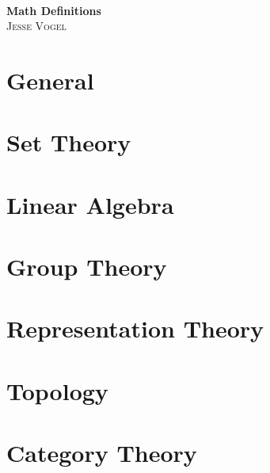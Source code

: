 \documentclass{report}
\begin{document}
\thispagestyle{empty}

\begin{center}
    \; \\ \vspace{5cm} \textbf{\Huge Math Definitions}
    \\ \vspace{2cm}
    \textsc{Jesse Vogel}
\end{center}

\newpage

{
    \renewcommand{\baselinestretch}{0.6}\normalsize
    \tableofcontents
}

\newcommand{\cat}{}

\chapter{General}
\renewcommand{\cat}{GM}


\chapter{Set Theory}
\renewcommand{\cat}{ST}



\chapter{Linear Algebra}
\renewcommand{\cat}{LA}







\chapter{Group Theory}
\renewcommand{\cat}{GT}


\chapter{Representation Theory}
\renewcommand{\cat}{RT}


\chapter{Topology}
\renewcommand{\cat}{TO}


\chapter{Category Theory}
\renewcommand{\cat}{CT}



\end{document}
